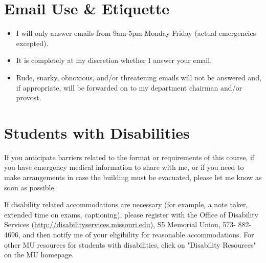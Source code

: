\documentclass[11pt]{article}
\begin{document}
\section{Email Use \& Etiquette}


\begin{itemize}

\item I will only answer emails from 9am-5pm Monday-Friday (actual emergencies excepted). 

\item It is completely at my discretion whether I answer your email.

\item Rude, snarky, obnoxious, and/or threatening emails will not be answered and, if appropriate, will be forwarded on to my department chairman and/or provost.

\end{itemize}

\section{Students with Disabilities}

If you anticipate barriers related to the format or requirements of this course, if you have emergency medical information to share with me, or if you need to make arrangements in case the building must be evacuated, please let me know as soon as possible.

If disability related accommodations are necessary (for example, a note taker, extended time on exams, captioning), please register with the Office of Disability Services (\url{http://disabilityservices.missouri.edu}), S5 Memorial Union, 573- 882-4696, and then notify me of your eligibility for reasonable accommodations.  For other MU resources for students with disabilities, click on "Disability Resources" on the MU homepage.
\end{document}
